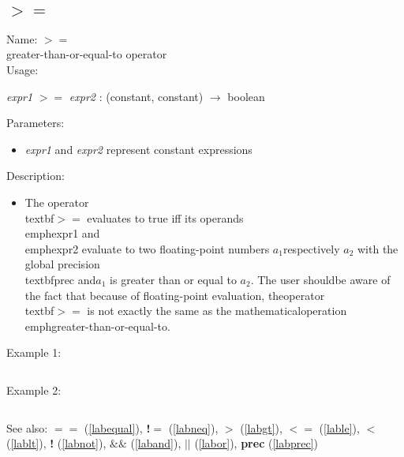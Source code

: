 \subsection{$>=$}
\label{labge}
\noindent Name: \textbf{$>=$}\\
greater-than-or-equal-to operator\\
\noindent Usage: 
\begin{center}
\emph{expr1} \textbf{$>=$} \emph{expr2} : (\textsf{constant}, \textsf{constant}) $\rightarrow$ \textsf{boolean}\\
\end{center}
Parameters: 
\begin{itemize}
\item \emph{expr1} and \emph{expr2} represent constant expressions
\end{itemize}
\noindent Description: \begin{itemize}

\item The operator \\textbf{$>=$} evaluates to true iff its operands \\emph{expr1} and\n   \\emph{expr2} evaluate to two floating-point numbers $a_1$\n   respectively $a_2$ with the global precision \\textbf{prec} and\n   $a_1$ is greater than or equal to $a_2$. The user should\n   be aware of the fact that because of floating-point evaluation, the\n   operator \\textbf{$>=$} is not exactly the same as the mathematical\n   operation \\emph{greater-than-or-equal-to}.\n\end{itemize}
\noindent Example 1: 
\begin{center}\begin{minipage}{15cm}\begin{Verbatim}[frame=single]
\end{Verbatim}
\end{minipage}\end{center}
\noindent Example 2: 
\begin{center}\begin{minipage}{15cm}\begin{Verbatim}[frame=single]
\end{Verbatim}
\end{minipage}\end{center}
See also: \textbf{$==$} (\ref{labequal}), \textbf{!$=$} (\ref{labneq}), \textbf{$>$} (\ref{labgt}), \textbf{$<=$} (\ref{lable}), \textbf{$<$} (\ref{lablt}), \textbf{!} (\ref{labnot}), \textbf{$\&\&$} (\ref{laband}), \textbf{$||$} (\ref{labor}), \textbf{prec} (\ref{labprec})
